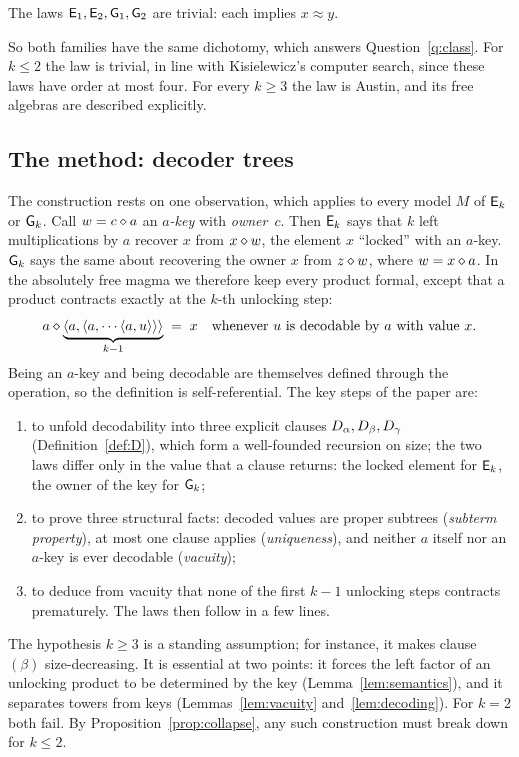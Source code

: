 \begin{proposition}\label{prop:collapse}
The laws $\mathsf{E}_{1},\mathsf{E}_{2},\mathsf{G}_{1},\mathsf{G}_{2}$ are trivial: each implies $x\approx y$.
\end{proposition}

So both families have the same dichotomy, which answers
Question~\ref{q:class}. For $k\le 2$ the law is trivial, in line with
Kisielewicz's computer search, since these laws have order at most four. For
every $k\ge3$ the law is Austin, and its free algebras are described
explicitly.

\subsection{The method: decoder trees}
The construction rests on one observation, which applies to every model $M$
of $\mathsf{E}_{k}$ or $\mathsf{G}_{k}$. Call $w=c\mathbin{\diamond} a$ an \emph{$a$-key} with
\emph{owner}~$c$. Then $\mathsf{E}_{k}$ says that $k$ left multiplications by $a$ recover
$x$ from $x\mathbin{\diamond} w$, the element $x$ ``locked'' with an $a$-key. $\mathsf{G}_{k}$ says the
same about recovering the owner $x$ from $z\mathbin{\diamond} w$, where $w=x\mathbin{\diamond} a$. In the
absolutely free magma we therefore keep every product formal, except that a
product contracts exactly at the $k$-th unlocking step:
\[
  a \mathbin{\diamond} \underbrace{\langle a,\langle a,\cdots\langle a,u\rangle\rangle\rangle}_{k-1} \;=\; x
  \quad\text{whenever } u \text{ is decodable by } a \text{ with value } x .
\]
Being an $a$-key and being decodable are themselves defined through the
operation, so the definition is self-referential. The key steps of the paper
are:
\begin{enumerate}[label=(\roman*)]
\item to unfold decodability into three explicit clauses
  $D_\alpha,D_\beta,D_\gamma$ (Definition~\ref{def:D}), which form a
  well-founded recursion on size; the two laws differ only in the value that a
  clause returns: the locked element for $\mathsf{E}_{k}$, the owner of the key for
  $\mathsf{G}_{k}$;
\item to prove three structural facts: decoded values are proper
  subtrees (\emph{subterm property}), at most one clause applies
  (\emph{uniqueness}), and neither $a$ itself nor an $a$-key is ever decodable
  (\emph{vacuity});
\item to deduce from vacuity that none of the first $k-1$ unlocking steps
  contracts prematurely. The laws then follow in a few lines.
\end{enumerate}
The hypothesis $k\ge3$ is a standing assumption; for instance, it makes clause
$(\beta)$ size-decreasing. It is essential at two points: it forces the left
factor of an unlocking product to be determined by the key
(Lemma~\ref{lem:semantics}), and it separates towers from keys
(Lemmas~\ref{lem:vacuity} and~\ref{lem:decoding}). For $k=2$ both fail. By
Proposition~\ref{prop:collapse}, any such construction must break down for
$k\le2$.

